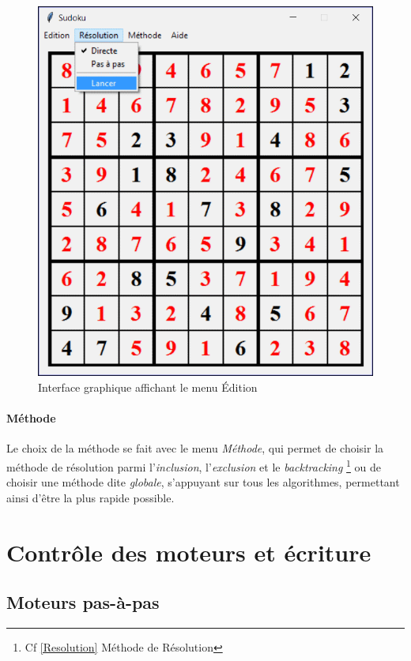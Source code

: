 \documentclass[12pt,a4paper]{report}
\begin{document}
\begin{figure}[!h]
 \center
 \includegraphics[scale=0.5]{../pictures/Sudoku_resolution}
 \caption{Interface graphique affichant le menu Édition}
\end{figure}

\paragraph{Méthode}Le choix de la méthode se fait avec le menu \emph{Méthode}, qui permet de choisir la méthode de résolution parmi l'\emph{inclusion}, l'\emph{exclusion }et le \emph{backtracking} \footnote{Cf \ref{Resolution} Méthode de Résolution} ou de choisir une méthode dite \emph{globale}, s'appuyant sur tous les algorithmes, permettant ainsi d'être la plus rapide possible.

\section{Contrôle des moteurs et écriture}
\subsection{Moteurs pas-à-pas}
\end{document}
